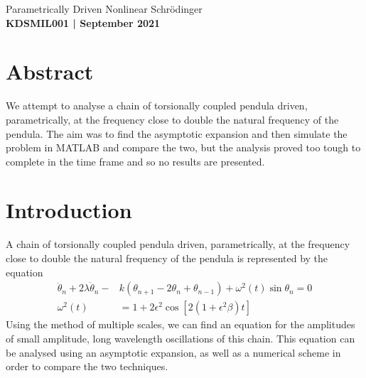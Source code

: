 \documentclass[11pt]{article}
\numberwithin{equation}{section}
\numberwithin{figure}{section}
\numberwithin{table}{section}
\begin{document}
\begin{center}
    {\huge Parametrically Driven Nonlinear Schr\"odinger}\\
    \vspace{0.2in}
    \textbf{KDSMIL001 | September 2021}

    \section*{Abstract}\label{sec:Abstract}
    We attempt to analyse a chain of torsionally coupled pendula driven, parametrically, at the frequency close to double the natural frequency of the pendula. The aim was to find the asymptotic expansion and then simulate the problem in MATLAB and compare the two, but the analysis proved too tough to complete in the time frame and so no results are presented.
    
\end{center}

\section{Introduction}\label{sec:Introduction}
A chain of torsionally coupled pendula driven, parametrically, at the frequency close to double the natural frequency of the pendula is represented by the equation
\begin{equation}
    \begin{aligned}
        \ddot\theta_n+2\lambda\dot\theta_n-&k(\theta_{n+1}-2\theta_n+\theta_{n-1})+\omega^2(t)\sin\theta_n=0\\
        \omega^2(t)&=1+2\epsilon^2\cos[2(1+\epsilon^2\beta)t]
    \end{aligned}
    \label{eqn:chain}
\end{equation}
Using the method of multiple scales, we can find an equation for the amplitudes of small amplitude, long wavelength oscillations of this chain. This equation can be analysed using an asymptotic expansion, as well as a numerical scheme in order to compare the two techniques.
\end{document}
